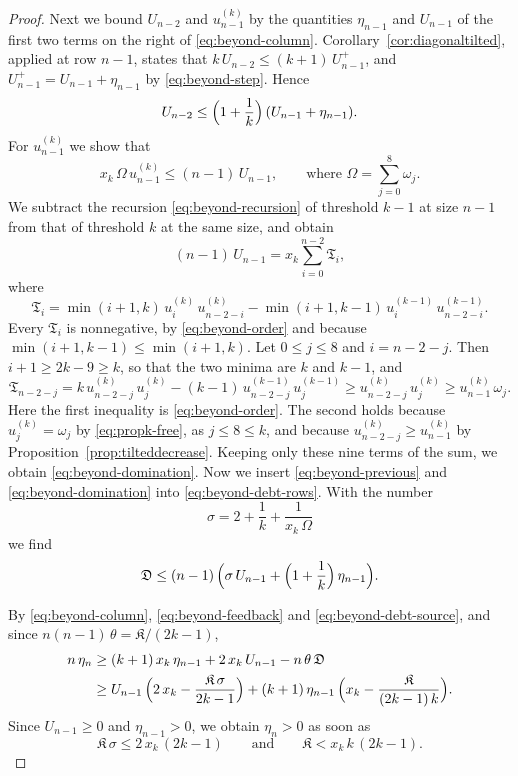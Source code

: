 \documentclass{amsart}
\theoremstyle{definition}
\theoremstyle{remark}
\numberwithin{equation}{section}
\begin{document}
\begin{proof}
Next we bound $U_{n-2}$ and
$u^{(k)}_{n-1}$ by the quantities $\eta_{n-1}$ and $U_{n-1}$ of the first
two terms on the right of \eqref{eq:beyond-column}.
Corollary~\ref{cor:diagonaltilted}, applied at row $n-1$, states that
$k\,U_{n-2}\le(k+1)\,U^{+}_{n-1}$, and $U^{+}_{n-1}=U_{n-1}+\eta_{n-1}$ by
\eqref{eq:beyond-step}. Hence
\begin{equation}\label{eq:beyond-previous}
U_{n-2}\le\Bigl(1+\frac1k\Bigr)\,(U_{n-1}+\eta_{n-1}) .
\end{equation}
For $u^{(k)}_{n-1}$ we show that
\begin{equation}\label{eq:beyond-domination}
x_k\,\Omega\,u^{(k)}_{n-1}\le(n-1)\,U_{n-1},
\qquad\text{where }\Omega=\sum_{j=0}^{8}\omega_j .
\end{equation}
We subtract the recursion \eqref{eq:beyond-recursion} of threshold $k-1$
at size $n-1$ from that of threshold $k$ at the same size, and
obtain
\[
(n-1)\,U_{n-1}=x_k\sum_{i=0}^{n-2}\mathfrak T_i ,
\]
where
\[
\mathfrak T_i=\min(i+1,k)\,u^{(k)}_i\,u^{(k)}_{n-2-i}
-\min(i+1,k-1)\,u^{(k-1)}_i\,u^{(k-1)}_{n-2-i} .
\]
Every $\mathfrak T_i$ is nonnegative, by \eqref{eq:beyond-order} and because
$\min(i+1,k-1)\le\min(i+1,k)$. Let $0\le j\le8$ and $i=n-2-j$. Then
$i+1\ge2k-9\ge k$, so that the two minima are $k$ and $k-1$, and
\[
\mathfrak T_{n-2-j}=k\,u^{(k)}_{n-2-j}\,u^{(k)}_j
-(k-1)\,u^{(k-1)}_{n-2-j}\,u^{(k-1)}_j
\ge u^{(k)}_{n-2-j}\,u^{(k)}_j\ge u^{(k)}_{n-1}\,\omega_j .
\]
Here the first inequality is \eqref{eq:beyond-order}. The second holds
because $u^{(k)}_j=\omega_j$ by \eqref{eq:propk-free}, as $j\le8\le k$,
and because $u^{(k)}_{n-2-j}\ge u^{(k)}_{n-1}$ by
Proposition~\ref{prop:tilteddecrease}. Keeping only these nine terms of the
sum, we obtain \eqref{eq:beyond-domination}. Now we insert
\eqref{eq:beyond-previous} and \eqref{eq:beyond-domination} into
\eqref{eq:beyond-debt-rows}. With the number
\[
\sigma=2+\frac1k+\frac{1}{x_k\,\Omega}
\]
we find
\begin{equation}\label{eq:beyond-debt-source}
\mathfrak D\le(n-1)\,\Bigl(\sigma\,U_{n-1}
+\Bigl(1+\frac1k\Bigr)\,\eta_{n-1}\Bigr).
\end{equation}

By \eqref{eq:beyond-column},
\eqref{eq:beyond-feedback} and \eqref{eq:beyond-debt-source}, and since
$n(n-1)\,\theta=\mathfrak K/(2k-1)$,
\begin{align*}
n\,\eta_n&\ge(k+1)\,x_k\,\eta_{n-1}+2\,x_k\,U_{n-1}-n\,\theta\,\mathfrak D\\
&\ge U_{n-1}\,\Bigl(2\,x_k-\frac{\mathfrak K\,\sigma}{2k-1}\Bigr)
+(k+1)\,\eta_{n-1}\,\Bigl(x_k-\frac{\mathfrak K}{(2k-1)\,k}\Bigr).
\end{align*}
Since $U_{n-1}\ge0$ and $\eta_{n-1}>0$, we obtain $\eta_n>0$ as soon as
\begin{equation}\label{eq:beyond-conditions}
\mathfrak K\,\sigma\le2\,x_k\,(2k-1)\qquad\text{and}\qquad
\mathfrak K<x_k\,k\,(2k-1).
\end{equation}


\end{proof}
\end{document}
